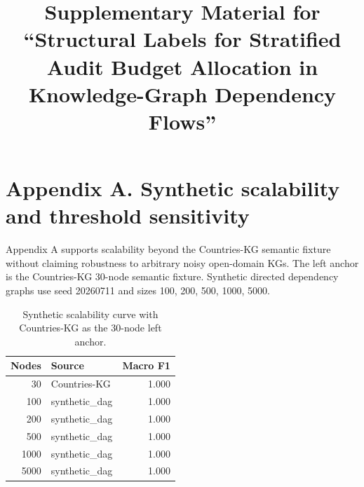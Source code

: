 \documentclass[pdflatex,sn-mathphys-num]{sn-jnl}
\begin{document}
\title[Supplementary Material]{Supplementary Material for ``Structural Labels for Stratified Audit Budget Allocation in Knowledge-Graph Dependency Flows''}
\author*[1]{ }
\author[1,2]{ }
\maketitle

\section{Appendix A. Synthetic scalability and threshold sensitivity}
\label{app:supp-synthetic-scalability}

Appendix A supports scalability beyond the Countries-KG semantic fixture without claiming robustness to arbitrary noisy open-domain KGs. The left anchor is the Countries-KG 30-node semantic fixture. Synthetic directed dependency graphs use seed 20260711 and sizes 100, 200, 500, 1000, 5000.

\begin{table}[h]
\caption{Synthetic scalability curve with Countries-KG as the 30-node left anchor.}
\label{tab:supp-synthetic-scalability}
\centering
\small
\begin{tabular}{rlr}
\toprule
\textbf{Nodes} & \textbf{Source} & \textbf{Macro F1} \\
\midrule
30 & Countries-KG & 1.000 \\
100 & synthetic\_dag & 1.000 \\
200 & synthetic\_dag & 1.000 \\
500 & synthetic\_dag & 1.000 \\
1000 & synthetic\_dag & 1.000 \\
5000 & synthetic\_dag & 1.000 \\
\bottomrule
\end{tabular}
\end{table}
\end{document}
